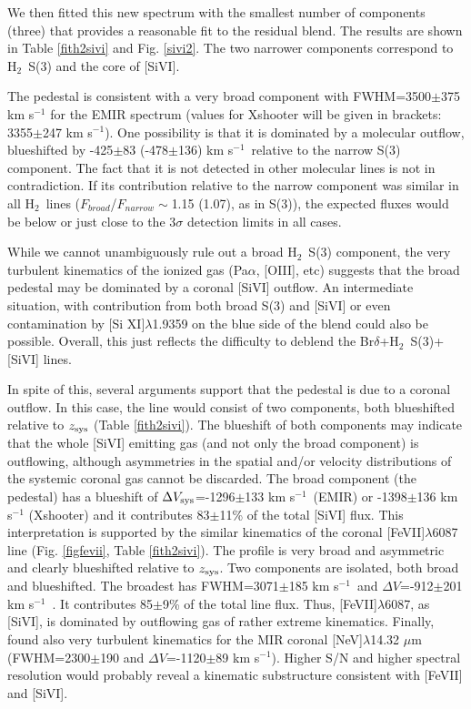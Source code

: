 \documentclass{aa}
\newcommand{\kms}{km s$^{-1}$~}
\newcommand{\brd}{Br$\delta$}
\newcommand{\hmol}{H$_2$~}
\begin{document}
We then fitted this new spectrum with the smallest number of components (three) that provides a reasonable fit to the residual blend.  The results are shown in Table \ref{fith2sivi} and Fig. \ref{sivi2}. The two narrower components correspond to \hmol S(3) and the core of [SiVI]. 

The  pedestal  is consistent with a very broad  component with FWHM=3500$\pm$375 km s$^{-1}$ for the EMIR spectrum (values for Xshooter will be given in brackets: 3355$\pm$247 km s$^{-1}$). 
 One possibility is that it is  dominated by a molecular outflow, blueshifted by -425$\pm$83 (-478$\pm$136) \kms  relative to the narrow S(3) component. The fact that it is not detected in other molecular lines is not in contradiction.  If its  contribution relative to the narrow component was similar in all \hmol lines ($F_{broad}$/$F_{narrow}\sim$1.15 (1.07), as in S(3)), the expected fluxes would be below or just close to the 3$\sigma$ detection limits in all cases.
 

While we cannot unambiguously rule out a broad  \hmol S(3) component, the  very turbulent kinematics of the ionized gas (Pa$\alpha$, [OIII], etc)  suggests  that  the   broad pedestal may be dominated  by a coronal [SiVI] outflow.  An intermediate situation, with contribution from both broad S(3) and  [SiVI] or even contamination by  [Si XI]$\lambda$1.9359 on the blue side  of the blend could also be possible.  Overall, this just reflects the difficulty to deblend the \brd +\hmol S(3)+[SiVI] lines. 


In spite of this, several arguments support that the pedestal is due to a coronal outflow. In this case,  the line would consist of two components, both blueshifted relative to $z_{\rm sys}$ (Table \ref{fith2sivi}).   The blueshift of both components may indicate that the whole [SiVI] emitting gas (and not only the broad component) is  outflowing, although  asymmetries in the spatial and/or velocity   distributions of the systemic coronal gas cannot be discarded.  The broad component (the pedestal) has   a blueshift of  $\Delta V_{\rm sys}$=-1296$\pm$133 \kms (EMIR) or -1398$\pm$136 km s$^{-1}$ (Xshooter)  and it contributes 83$\pm$11\% of the total [SiVI] flux. 
 This interpretation is supported by the similar kinematics of the coronal [FeVII]$\lambda$6087 line (Fig. \ref{figfevii},  Table \ref{fith2sivi}). The profile is  very broad and asymmetric and clearly blueshifted relative to $z_{\rm sys}$. Two components are isolated, both  broad and blueshifted.  The broadest has FWHM=3071$\pm$185 \kms  and $\Delta V$=-912$\pm$201 \kms. It contributes 85$\pm$9\% of the total line flux.  Thus, [FeVII]$\lambda$6087, as [SiVI], is  dominated by  outflowing gas of rather extreme kinematics.  Finally, \citealt{Spoon2009b} found also very turbulent kinematics for  the MIR coronal [NeV]$\lambda$14.32 $\mu$m (FWHM=2300$\pm$190 and  $\Delta V$=-1120$\pm$89 km s$^{-1}$). Higher S/N and higher spectral resolution would probably reveal a  kinematic substructure  consistent with [FeVII] and [SiVI].
\end{document}
